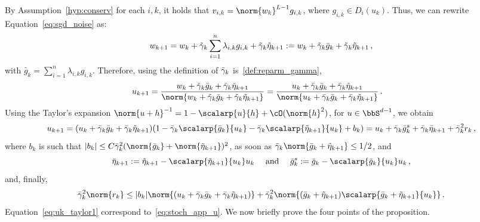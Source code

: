 By Assumption~\ref{hyp:conserv} for each $i,k$, it holds that $v_{i,k} = \norm{w_k}^{L-1}g_{i,k}$, where $g_{i,k} \in D_i(u_k)$. Thus, we can rewrite Equation~\eqref{eq:sgd_noise} as:
\begin{equation}\label{eq:first_wk}
    w_{k+1} = w_k + \tilde{\gamma}_k \sum_{i=1}^n \lambda_{i,k} g_{i,k} + \tilde{\gamma}_k \tilde{\eta}_{k+1} :=w_{k} + \tilde{\gamma}_k \bar{g}_k + \tilde{\gamma}_k \tilde{\eta}_{k+1} \, ,
\end{equation}
with $\bar{g}_k = \sum_{i=1}^n\lambda_{i,k} g_{i,k}$.
Therefore, using the definition of $\bar{\gamma}_k$ is~\eqref{def:reparm_gamma},
\begin{equation}\label{eq:uk_taylor1}
  \begin{split}
      u_{k+1} &= \frac{w_{k}+\tgamma_k \bg_k + \tgamma_k \tilde{\eta}_{k+1}}{\norm{w_{k}+\tgamma_k \bg_k + \tgamma_k \tilde{\eta}_{k+1}}} =
      \frac{u_k + \bgamma_k \bg_k + \bgamma_k \tilde{\eta}_{k+1}}{\norm{u_k + \bgamma_k \bg_k + \bgamma_k \tilde{\eta}_{k+1}}}\, .
        \end{split}
\end{equation}
Using the Taylor's expansion $\norm{u+h}^{-1} = 1- \scalarp{u}{h} + \cO(\norm{h}^2)$, for $u \in \bbS^{d-1}$, we obtain
\begin{equation}\label{eq:pf_uk_stochapp}
  u_{k+1}=(u_k + \bgamma_k \bg_k + \bgamma_k \tilde{\eta}_{k+1})(1 - \bgamma_k\scalarp{\bg_k}{u_k} -\bgamma_k\scalarp{\tilde{\eta}_{k+1}}{u_k} + b_k) = u_k + \bar{\gamma}_k \bg_k^s + \bgamma_k \bar{\eta}_{k+1} + \bar{\gamma}_k^2 r_k\, ,
\end{equation}
where $b_k$ is such that $|b_k| \leq C \bgamma_k^2 (\norm{\bg_k} + \norm{\tilde{\eta}_{k+1}})^2$, as soon as $\bgamma_k \norm{\bg_k + \tilde{\eta}_{k+1}} \leq 1/2$, and 
\begin{equation}\label{eqdef:proj_nois_subg}
  \bar{\eta}_{k+1} := \tilde{\eta}_{k+1} - \scalarp{\tilde{\eta}_{k+1}}{u_k} u_k \quad \textrm{ and } \quad \bar{g}_k^s := \bg_k - \scalarp{\bg_k}{u_k} u_k\, ,
\end{equation}
and, finally, 
\begin{equation}\label{eq:rk_bound}
 \bgamma_k^2 \norm{r_k} \leq |b_k|\norm{(u_k + \bgamma_k \bg_k + \bgamma_k \tilde{\eta}_{k+1})} + \bgamma_k^2 \norm{(\bg_k + \tilde{\eta}_{k+1})\scalarp{\bg_k + \tilde{\eta}_{k+1}}{u_k}}\, .
\end{equation}
Equation~\eqref{eq:uk_taylor1} correspond to~\eqref{eq:stoch_app_u}. We now briefly prove the four points of the proposition. 

